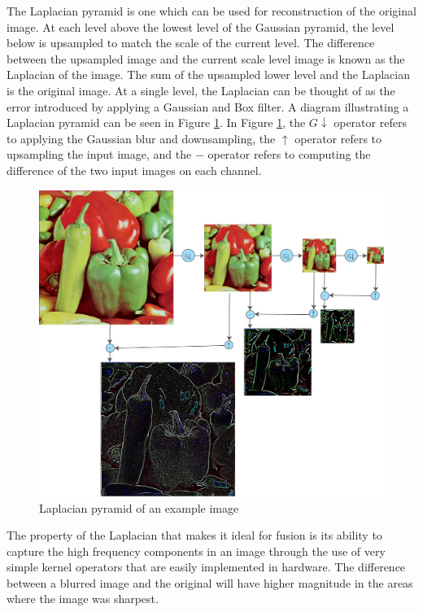 \documentclass[sigconf]{acmart/acmart}
\begin{document}
The Laplacian pyramid is one which can be used for reconstruction of the original image. At each level above the lowest level of the Gaussian pyramid, the level below is upsampled to match the scale of the current level. The difference between the upsampled image and the current scale level image is known as the Laplacian of the image. The sum of the upsampled lower level and the Laplacian is the original image. At a single level, the Laplacian can be thought of as the error introduced by applying a Gaussian and Box filter. A diagram illustrating a Laplacian pyramid can be seen in Figure \ref{fig_pepper_laplacian_pyramid}. In Figure \ref{fig_pepper_laplacian_pyramid}, the $G\downarrow$ operator refers to applying the Gaussian blur and downsampling, the $\uparrow$ operator refers to upsampling the input image, and the $-$ operator refers to computing the difference of the two input 
images on each channel.
\begin{figure}[h]
	\centering
	\includegraphics[width=\textwidth]{figures/peppers/laplacian_pyramid}
	\caption{Laplacian pyramid of an example image}
	\label{fig_pepper_laplacian_pyramid}
\end{figure}

The property of the Laplacian that makes it ideal for fusion is its ability to capture the high frequency components in an image through the use of very simple kernel operators that are easily implemented in hardware. The difference between a blurred image and the original will have higher magnitude in the areas where the image was sharpest.
\end{document}
